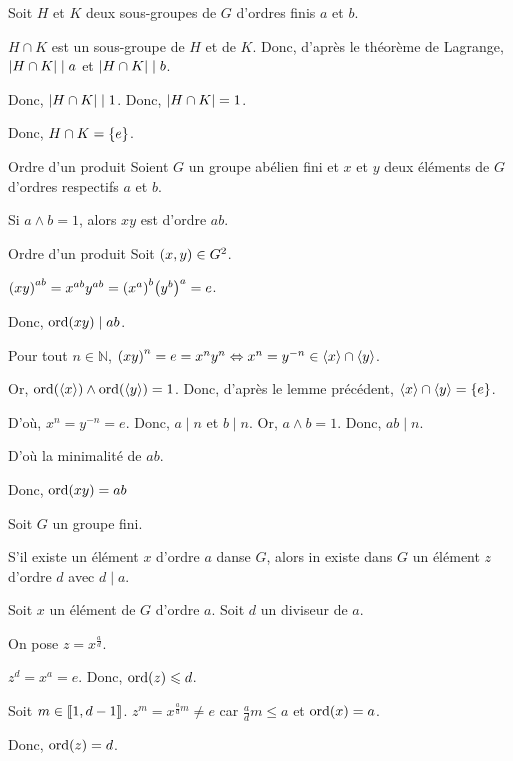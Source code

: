 \documentclass[a4paper,12pt]{article}
\renewcommand\l{\left(}
\renewcommand\r{\right)}
\let\oldleft\left
\renewcommand{\left}{\mathopen{}\mathclose\bgroup\oldleft}
\let\oldright\right
\renewcommand{\right}{\aftergroup\egroup\oldright}
\DeclareMathOperator{\oldord}{ord}
\newcommand{\ord}[1]{\oldord\l#1\r}
\newcommand{\la}{\left\langle}
\newcommand{\ra}{\right\rangle}
\begin{document}
\begin{prv*}{}
Soit $H$ et $K$ deux sous-groupes de $G$ d'ordres finis $a$ et $b$.

$H\cap K$ est un sous-groupe de $H$ et de $K$. Donc, d'après le théorème de Lagrange, $\left|H\cap K\right|\mid a$ et $\left|H\cap K\right|\mid b$.

Donc, $\left|H\cap K\right|\mid 1$. Donc, $\left|H\cap K\right|=1$.

Donc, $H\cap K=\left\{e\right\}$.
\end{prv*}


\begin{prp*}{Ordre d'un produit}
Soient $G$ un groupe abélien fini et $x$ et $y$ deux éléments de $G$ d'ordres respectifs $a$ et $b$.

Si $a\wedge b=1$, alors $xy$ est d'ordre $ab$.
\end{prp*}

\begin{prv*}{Ordre d'un produit}
Soit $\l x,y\r\in G^2$.

$\l xy\r^{ab}=x^{ab}y^{ab}=\l x^a\r^b\l y^b\r^a=e$.

Donc, $\ord{xy}\mid ab$.

Pour tout $n\in\mathbb N$, $\l xy\r^n=e=x^ny^n\Leftrightarrow x^n=y^{-n}\in\la x\ra\cap\la y\ra$.

Or, $\ord{\la x\ra}\wedge\ord{\la y\ra}=1$. Donc, d'après le lemme précédent, $\la x\ra\cap\la y\ra=\left\{e\right\}$.

D'où, $x^n=y^{-n}=e$. Donc, $a\mid n$ et $b\mid n$. Or, $a\wedge b=1$. Donc, $ab\mid n$.

D'où la minimalité de $ab$.

Donc, $\ord{xy}=ab$
\end{prv*}


\begin{lm*}{}
Soit $G$ un groupe fini.

S'il existe un élément $x$ d'ordre $a$ danse $G$, alors in existe dans $G$ un élément $z$ d'ordre $d$ avec $d\mid a$.
\end{lm*}

\begin{prv*}{}
Soit $x$ un élément de $G$ d'ordre $a$. Soit $d$ un diviseur de $a$.

On pose $z=x^\frac ad$.

$z^d=x^a=e$. Donc, $\ord{z}\leqslant d$.

Soit $m\in\left\llbracket1,d-1\right\rrbracket$. $z^m=x^{\frac adm}\neq e$ car $\frac adm\leqslant a$ et $\ord{x}=a$.

Donc, $\ord{z}=d$.
\end{prv*}
\end{document}
